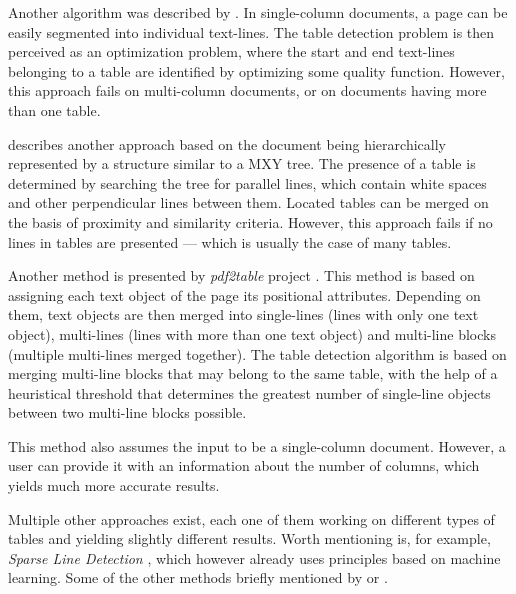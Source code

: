 Another algorithm was described by \citet{MediumTable}. In single-column documents, a page can be easily segmented into individual text-lines. The table detection problem is then perceived as an optimization problem, where the start and end text-lines belonging to a table are identified by optimizing some quality function. However, this approach fails on multi-column documents, or on documents having more than one table.

\citet{tableDetectCesarini} describes another approach based on the document being hierarchically represented by a structure similar to a MXY tree. The presence of a table is determined by searching the tree for parallel lines, which contain white spaces and other perpendicular lines between them. Located tables can be merged on the basis of proximity and similarity criteria. However, this approach fails if no lines in tables are presented --- which is usually the case of many tables.

Another method is presented by \emph{pdf2table} project \cite{pdf2table}. This method is based on assigning each text object of the page its positional attributes. Depending on them, text objects are then merged into single-lines (lines with only one text object), multi-lines (lines with more than one text object) and multi-line blocks (multiple multi-lines merged together). The table detection algorithm is based on merging multi-line blocks that may belong to the same table, with the help of a heuristical threshold that determines the greatest number of single-line objects between two multi-line blocks possible.

This method also assumes the input to be a single-column document. However, a user can provide it with an information about the number of columns, which yields much more accurate results.

Multiple other approaches exist, each one of them working on different types of tables and yielding slightly different results. Worth mentioning is, for example, \emph{Sparse Line Detection} \cite{sparseLineDetection}, which however already uses principles based on machine learning. Some of the other methods briefly mentioned by \citet{otherDetection1} or \citet{otherDetection2}.
